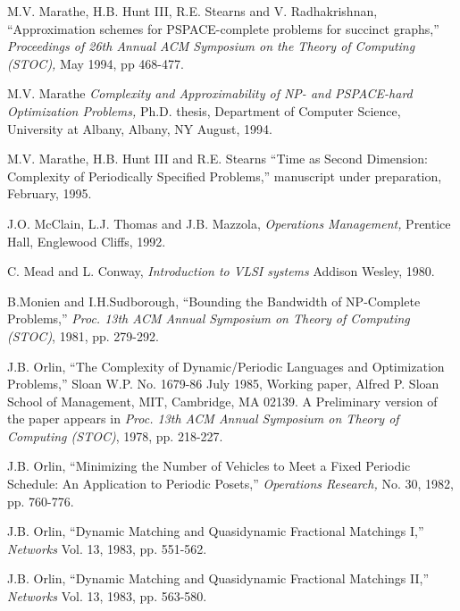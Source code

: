 \begin{thebibliography}{HMRR93}
  M.V. Marathe, H.B. Hunt III, 
R.E. Stearns and V. Radhakrishnan,
``Approximation schemes for
{PSPACE}-complete problems for succinct graphs,'' 
{\em Proceedings of 26th Annual ACM
Symposium on the Theory of Computing (STOC),} May 1994,
pp 468-477.




 M.V. Marathe
{\em Complexity and Approximability of {NP}- and {PSPACE}-hard Optimization
Problems,}
Ph.D. thesis, Department of Computer Science, 
University at Albany,  Albany, NY August, 1994.


 M.V. Marathe, H.B. Hunt III and R.E. Stearns 
``Time as  Second Dimension: Complexity of Periodically Specified Problems,''
manuscript under preparation,
February, 1995.





 J.O. McClain, L.J. Thomas and J.B. Mazzola,
{\em Operations Management,}
Prentice Hall, Englewood Cliffs, 1992.

 C. Mead and L. Conway,
{\em Introduction to VLSI systems}
Addison Wesley, 1980.




 B.Monien and I.H.Sudborough, 
``Bounding the Bandwidth of {NP}-Complete Problems,''
{\em Proc. 13th ACM Annual Symposium on Theory of Computing (STOC)},
1981, pp. 279-292.






 J.B. Orlin,
``The Complexity of Dynamic/Periodic Languages and Optimization Problems,''
Sloan W.P. No. 1679-86 July 1985,
Working paper, Alfred P. Sloan School of Management,
MIT, Cambridge, MA 02139. A Preliminary version of the paper appears in
{\em Proc. 13th ACM Annual Symposium on Theory of Computing (STOC)}, 
1978, pp. 218-227.





 J.B. Orlin,
``Minimizing the Number of Vehicles to Meet a Fixed Periodic Schedule:
An Application to Periodic Posets,''
{\em Operations Research,}
No. 30, 1982, pp. 760-776.




 J.B. Orlin,
``Dynamic Matching and Quasidynamic Fractional Matchings I,''
{\em Networks}
Vol. 13,  1983, pp. 551-562.


 J.B. Orlin,
``Dynamic Matching and Quasidynamic Fractional Matchings II,''
{\em Networks}
Vol. 13,  1983, pp. 563-580.



\end{thebibliography}
